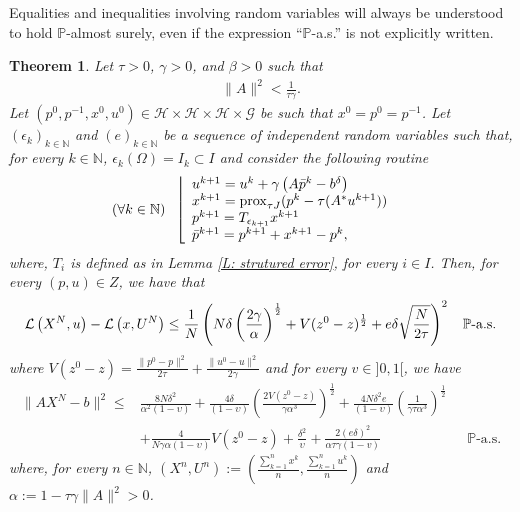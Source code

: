 \documentclass[11pt]{report}
\newcommand{\NN}{\ensuremath{\mathbb N}}
\newcommand{\prox}{\ensuremath{\operatorname{prox}}}
\newtheorem{theorem}{Theorem}[chapter]
\theoremstyle{plain}{\theorembodyfont{\rmfamily}%
\newtheorem{assumption}[theorem]{Assumption}}
\theoremstyle{plain}{\theorembodyfont{\rmfamily}%
\newtheorem{algorithm}[theorem]{Algorithm}}
\theoremstyle{plain}{\theorembodyfont{\rmfamily}%
\newtheorem{example}[theorem]{Example}}
\theoremstyle{plain}{\theorembodyfont{\rmfamily}%
\newtheorem{remark}[theorem]{Remark}}
\theoremstyle{plain}{\theorembodyfont{\rmfamily}%
\newtheorem{definition}[theorem]{Definition}}
\theoremstyle{plain}{\theorembodyfont{\rmfamily}%
\newtheorem{problem}[theorem]{Problem}}
\numberwithin{equation}{chapter}
\newcommand{\dal}{u}
\newcommand{\prim}{x}
\newcommand{\proj}{p}
\newcommand{\Dal}{U}
\newcommand{\Prim}{X}
\begin{document}
\\ \\Equalities and inequalities involving random variables will always be understood to hold $\mathbb{P}$-almost surely, even if the expression “$\mathbb{P}$-a.s.” is not explicitly written.
\begin{theorem}
\label{T:  Inexalg}
Let $\tau>0$, $\gamma>0$, and $\beta>0$ such that \begin{align}
   \|A\|^2<\frac{1}{\tau\gamma}.
    \label{c: ConditionL}
\end{align} Let $(\proj^0,\proj^{-1}, \prim^{0},\dal^0)\in 
\mathcal{H}\times\mathcal{H}\times\mathcal{H}\times\mathcal{G}$ be such that 
$\prim^0=\proj^0=\proj^{-1}$. Let 
$(\epsilon_k)_{ k\in \mathbb{N}}$ and $(e)_{ k\in \mathbb{N}}$ be a sequence of independent 
random variables such that,  for every 
$k\in\NN$, $\epsilon_k(\Omega)= I_{k}\subset I$ and 
consider the following routine
\begin{align}
(\forall k\in\NN)\hspace{0.2cm}
&\left\lfloor 
\begin{array}{ll}
\dal^{k+1}= \dal^k+\gamma\left( A\bar{\proj}^k-b^\delta\right)\\
\prim^{k+1}=\prox_{\tau J}(\proj^k-\tau( A^*\dal^{k+1}))\\
\proj^{k+1}=T_{\epsilon_{k+1}}\prim^{k+1}\\
\bar{\proj}^{k+1}=
\proj^{k+1}+ \prim^{k+1}-\proj^{k},
\label{equation 4.1}
\end{array}
\right.
\end{align}
where, $T_{i}$ is defined as in Lemma \ref{L: strutured error}, for every $i\in I$.
Then, for every  $(\proj,\dal)\in Z$, we have that 
 \begin{align}
    \mathcal{L}\left(\Prim^{N},\dal\right)- \mathcal{L}\left(\prim,\Dal^{N}\right)\leq\frac{1}{N} \left(N\delta\left(\frac{2\gamma}{\alpha}\right)^{\frac{1}{2}}+V(z^{0}-z)^{\frac{1}{2}}+e\delta\sqrt{\frac{N}{2\tau}}\right)^2 \hspace{2mm}\text{  $\mathbb{P}$-a.s.}\end{align}
where $V(z^{0}-z)=\frac{\|\proj^0-\proj\|^2}{2\tau}+\frac{\|\dal^0-\dal\|^2}{2\gamma}$ and for every $v\in ]0,1[$, we have \begin{align}
        \|A\Prim^N-b\|^2\leq&\frac{8N\delta^2}{\alpha^{2}(1-\upsilon)}+\frac{4\delta}{(1-\upsilon)}\left(\frac{2 V(z^{0}-z)}{\gamma\alpha^3}\right)^{\frac{1}{2}}+\frac{4N\delta^2e}{(1-\upsilon)}\left(\frac{ 1}{\gamma\tau\alpha^3}\right)^{\frac{1}{2}}\nonumber\\&+\frac{4}{N\gamma\alpha(1-\upsilon)}V(z^{0}-z)+\frac{\delta^2}{\upsilon}+\frac{2(e\delta)^2}{\alpha\tau\gamma(1-v)}&\text{  $\mathbb{P}$-a.s.}
    \end{align}
    where, for every $n\in\NN$, $\left(\Prim^n,\Dal^n\right):=\left(\frac{\sum_{k=1}^{n}\prim^{k}}{n},\frac{\sum_{k=1}^{n}\dal^{k}}{n}\right)$  and $\alpha:=1-\tau\gamma\|A\|^2>0$.
\end{theorem}
\end{document}
